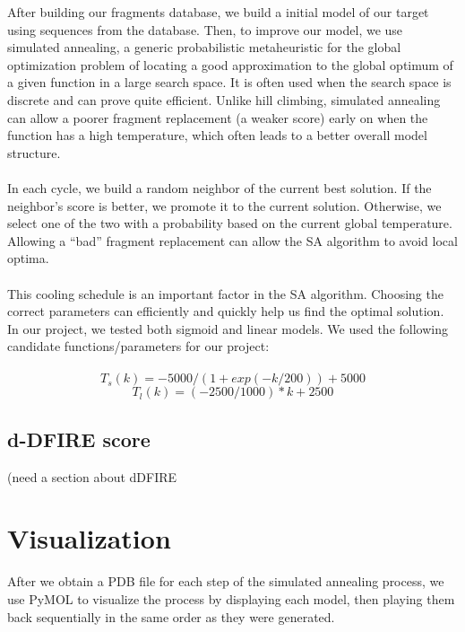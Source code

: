 \documentclass{article}
\begin{document}
\begin{enumerate}
After building our fragments database, we build a initial model of our target using sequences from the database. Then, to improve our model, we use simulated annealing, a generic probabilistic metaheuristic for the global optimization problem of locating a good approximation to the global optimum of a given function in a large search space. It is often used when the search space is discrete and can prove quite efficient. Unlike hill climbing, simulated annealing can allow a poorer fragment replacement (a weaker score) early on when the function has a high temperature, which often leads to a better overall model structure. \\\\
In each cycle, we build a random neighbor of the current best solution. If the neighbor’s score is better, we promote it to  the current solution. Otherwise, we select one of the two with a probability based on the current global temperature.  Allowing a “bad” fragment replacement can allow the SA algorithm to avoid local optima.  \\\\
     This cooling schedule is an important factor in the SA algorithm. Choosing the correct parameters can efficiently and quickly help us find the optimal solution. In our project, we tested both sigmoid and linear models. We used the following candidate functions/parameters for our project:\\\\
\begin{equation*}
      T_s(k) =  -5000/(1+ exp(-k/200))+5000
    \end{equation*}
\begin{equation*}
      T_l(k) =  (-2500/1000)*k + 2500
    \end{equation*}



\subsection{d-DFIRE score}

(need a section about dDFIRE

\section{Visualization}

After we obtain a PDB file for each step of the simulated annealing process, we use PyMOL to visualize the process by displaying each model, then playing them back sequentially in the same order as they were generated.



\end{enumerate}
\end{document}

